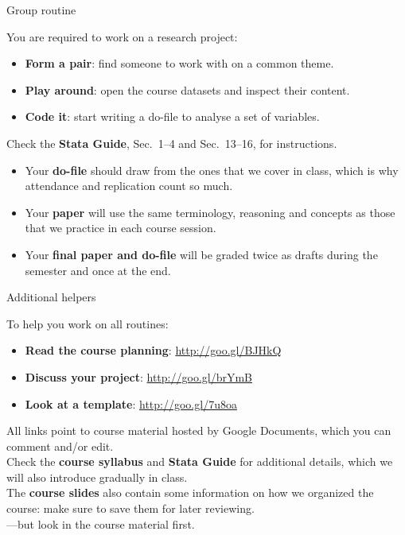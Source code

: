 \documentclass{beamer}
\begin{document}
	\begin{frame}[t]{Group routine}

	You are required to work on a research project:
		
	\begin{itemize}
		\item \textbf{Form a pair}: find someone to work with on a common theme.

		\item \textbf{Play around}: open the course datasets and inspect their content.
		
		\item \textbf{Code it}: start writing a do-file to analyse a set of variables.
	\end{itemize}
	
	Check the \textbf{Stata Guide}, Sec.~1--4 and Sec.~13--16, for instructions.\\[.5em]

	\begin{itemize}
		\item Your \textbf{do-file} should draw from the ones that we cover in class, which is why attendance and replication count so much.	
		\item Your \textbf{paper} will use the same terminology, reasoning and concepts as those that we practice in each course session.
		\item Your \textbf{final paper and do-file} will be graded twice as drafts during the semester and once at the end.
	\end{itemize}		

	\end{frame}

\begin{frame}[t]{Additional helpers}

	To help you work on all routines:
		
	\begin{itemize}
		\item \textbf{Read the course planning}: \url{http://goo.gl/BJHkQ}

		\item \textbf{Discuss your project}: \url{http://goo.gl/brYmB}
		
		\item \textbf{Look at a template}: \url{http://goo.gl/7u8oa}
	\end{itemize}
	
	All links point to course material hosted by Google Documents, which you can comment and/or edit.\\[.5em]

	Check the \textbf{course syllabus} and \textbf{Stata Guide} for additional details, which we will also introduce gradually in class.\\[.5em]
	
	The \textbf{course slides} also contain some information on how we organized the course: make sure to save them for later reviewing.\\[.5em]
	
	---but look in the course material first.
	
	\end{frame}
	
\end{document}
